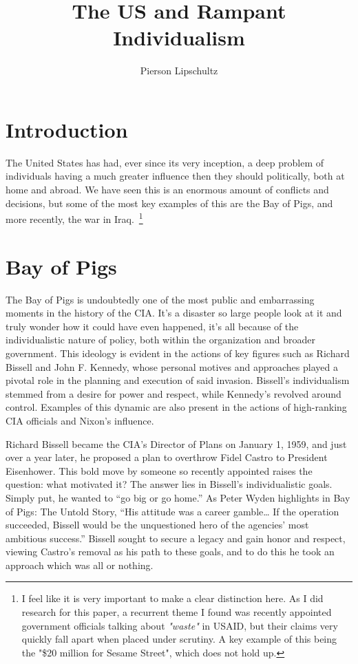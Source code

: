 \documentclass{article}
\title{The US and Rampant Individualism }
\author{Pierson Lipschultz}
\begin{document}
\maketitle



\section{Introduction}
    The United States has had, ever since its very inception, a deep problem of individuals having a much greater influence then they should politically, both at home and abroad. We have seen this is an enormous amount of conflicts and decisions, but some of the most key examples of this are the Bay of Pigs, and more recently, the war in Iraq.\ \footnote{I feel like it is very important to make a clear distinction here. As I did research for this paper, a recurrent  theme I found was recently appointed government officials talking about \textit{"waste"} in USAID, but their claims very quickly fall apart when placed under scrutiny. A key example of this being the "\$20 million for Sesame Street", which does not hold up.}

    \cite{CWC_2011}

\section{Bay of Pigs}
    The Bay of Pigs is undoubtedly one of the most public and embarrassing moments in the history of the CIA. It's a disaster so large people look at it and truly wonder how it could have even happened, it's all because of the individualistic nature of policy, both within the organization and broader government. This ideology is evident in the actions of key figures such as Richard Bissell and John F. Kennedy, whose personal motives and approaches played a pivotal role in the planning and execution of said invasion. Bissell's individualism stemmed from a desire for power and respect, while Kennedy's revolved around control. Examples of this dynamic are also present in the actions of high-ranking CIA officials and Nixon's influence.

    Richard Bissell became the CIA's Director of Plans on January 1, 1959, and just over a year later, he proposed a plan to overthrow Fidel Castro to President Eisenhower. This bold move by someone so recently appointed raises the question: what motivated it? The answer lies in Bissell's individualistic goals. Simply put, he wanted to “go big or go home.” As Peter Wyden highlights in Bay of Pigs: The Untold Story, “His attitude was a career gamble… If the operation succeeded, Bissell would be the unquestioned hero of the agencies' most ambitious success.” Bissell sought to secure a legacy and gain honor and respect, viewing Castro's removal as his path to these goals, and to do this he took an approach which was all or nothing.
\end{document}
